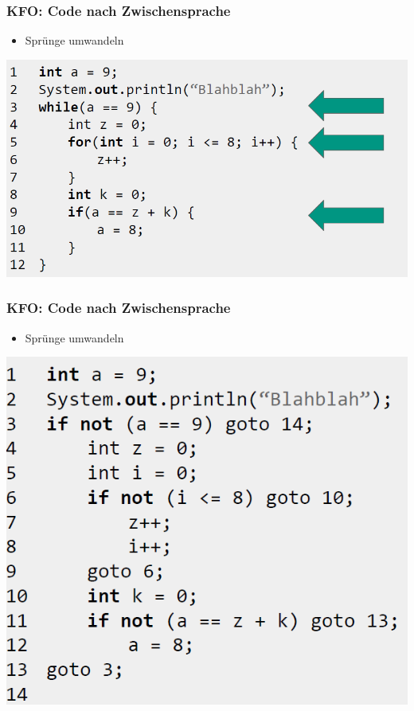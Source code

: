 \documentclass[18pt]{beamer}
\begin{document}
	\begin{frame}
		\frametitle{KFO: Code nach Zwischensprache}
		\begin{itemize}
			\item Sprünge umwandeln
		\end{itemize}
		\centering \includegraphics[scale=0.34]{./pics/tut5/code.png}
	\end{frame}

	\begin{frame}
		\frametitle{KFO: Code nach Zwischensprache}
		\begin{itemize}
			\item Sprünge umwandeln
		\end{itemize}
		\centering \includegraphics[scale=0.34]{./pics/tut5/code-jumps.png}
	\end{frame}
\end{document}
